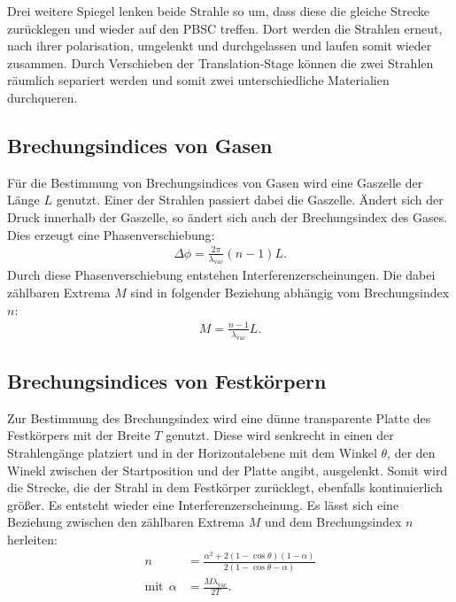 Drei weitere Spiegel lenken beide Strahle so um, dass diese die gleiche Strecke zurücklegen und wieder auf
den PBSC treffen. Dort werden die Strahlen erneut, nach ihrer polarisation,
umgelenkt und durchgelassen und laufen somit wieder zusammen.
Durch Verschieben der Translation-Stage können die zwei Strahlen räumlich separiert
werden und somit zwei unterschiedliche Materialien durchqueren.
\FloatBarrier

\subsection{Brechungsindices von Gasen}
Für die Bestimmung von Brechungsindices von Gasen wird eine Gaszelle
der Länge $L$ genutzt. Einer der Strahlen passiert dabei die Gaszelle.
Ändert sich der Druck innerhalb der Gaszelle, so ändert sich auch
der Brechungsindex des Gases. Dies erzeugt eine Phasenverschiebung:
\begin{align}
  \Delta\phi=\frac{2\pi}{\lambda_\mathrm{vac}}(n-1)L.
\end{align}
Durch diese Phasenverschiebung entstehen Interferenzerscheinungen.
Die dabei zählbaren Extrema $M$ sind in folgender Beziehung abhängig
vom Brechungsindex $n$:
\begin{align}
  M=\frac{n-1}{\lambda_\mathrm{vac}}L\label{eqn:gas}.
\end{align}

\subsection{Brechungsindices von Festkörpern}
Zur Bestimmung des Brechungsindex wird eine dünne transparente
Platte des Festkörpers mit der Breite $T$ genutzt. Diese wird senkrecht in einen der Strahlengänge
platziert und in der Horizontalebene mit dem  Winkel $\theta$, der den Winekl zwischen der Startposition und der Platte angibt, ausgelenkt. Somit wird die
Strecke, die der Strahl in dem Festkörper zurücklegt, ebenfalls kontinuierlich größer.
Es entsteht wieder eine Interferenzerscheinung.
Es lässt sich eine Beziehung zwischen den zählbaren Extrema $M$
und dem Brechungsindex $n$ herleiten:
\begin{align}%
  n&=\frac{\alpha^2+2(1-\cos\theta)(1-\alpha)}{2(1-\cos\theta-\alpha)}\\
  \text{mit} \ \ \alpha&= \frac{M\lambda_\mathrm{vac}}{2T}. \label{eqn:glas}
\end{align}
